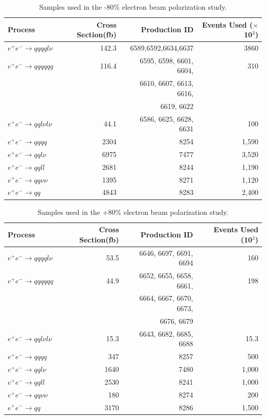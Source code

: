 \begin{table}
  \centering
  \begin{tabular}{l | r | r |r}
    \toprule
    Process     & Cross Section(fb) & Production ID & Events Used ($\times$10$^{3}$) \\
    \midrule
    $e^+e^-\rightarrow qqqql\nu$ & 142.3 & 6589,6592,6634,6637 & 3860 \\
    \midrule
    $e^+e^-\rightarrow qqqqqq$ & 116.4 & 6595, 6598, 6601, 6604,  & 310 \\
     &  & 6610, 6607, 6613, 6616,  &  \\
     &  &  6619, 6622  &  \\
    \midrule
    $e^+e^-\rightarrow qql\nu l\nu$ & 44.1 & 6586, 6625, 6628, 6631 & 100 \\
    \midrule
    $e^+e^-\rightarrow qqqq$ & 2304 & 8254 & 1,590 \\
    \midrule
    $e^+e^-\rightarrow qql\nu$ & 6975 & 7477 & 3,520 \\
    \midrule
    $e^+e^-\rightarrow qqll$ & 2681 & 8244 & 1,190 \\
    \midrule
    $e^+e^-\rightarrow qq\nu\nu$ & 1395 & 8271 & 1,120 \\
    \midrule
    $e^+e^-\rightarrow qq$ & 4843 & 8283 & 2,400 \\
    \bottomrule
  \end{tabular}
  \caption{Samples used in the -80\% electron beam polarization study.}
  \label{table:topsamplesnegpol}
\end{table}

\begin{table}
  \centering
  \begin{tabular}{l | r | r |r}
    \toprule
    Process     & Cross Section(fb) & Production ID & Events Used (10$^{3}$) \\
    \midrule
    $e^+e^-\rightarrow qqqql\nu$ & 53.5 & 6646, 6697, 6691, 6694 & 160 \\
    \midrule
    $e^+e^-\rightarrow qqqqqq$ & 44.9 & 6652, 6655, 6658, 6661, & 198 \\
     &  & 6664, 6667, 6670, 6673, &  \\
     &  & 6676, 6679 &  \\
    \midrule
    $e^+e^-\rightarrow qql\nu l\nu$ & 15.3  & 6643, 6682, 6685, 6688 & 15.3 \\
    \midrule
    $e^+e^-\rightarrow qqqq$ & 347 & 8257 & 500 \\
    \midrule
    $e^+e^-\rightarrow qql\nu$ & 1640 & 7480 & 1,000 \\
    \midrule
    $e^+e^-\rightarrow qqll$ & 2530 & 8241 & 1,000 \\
    \midrule
    $e^+e^-\rightarrow qq\nu\nu$ & 180 & 8274 & 200 \\
    \midrule
    $e^+e^-\rightarrow qq$ & 3170 & 8286 & 1,500 \\
    \bottomrule
  \end{tabular}
  \caption{Samples used in the +80\% electron beam polarization study.}
  \label{table:topsamplespospol}
\end{table}


